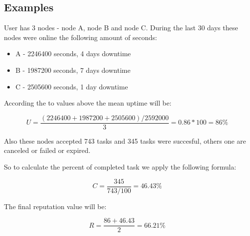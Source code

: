\subsection{Examples}

User has 3 nodes - node A, node B and node C. During the last 30 days these nodes were online the following amount of seconds:

\begin{itemize}
    \item A - 2246400 seconds, 4 days downtime
    \item B - 1987200 seconds, 7 days downtime
    \item C - 2505600 seconds, 1 day downtime
\end{itemize}

According the to values above the mean uptime will be:

\[
    U = \frac{(2246400 + 1987200 + 2505600) / 2592000}{3} = 0.86 * 100 = 86\%
\]

Also these nodes accepted 743 tasks and 345 tasks were succesful, others one are canceled or failed or expired.

So to calculate the percent of completed task we apply the following formula:

\[
    C = \frac{345}{743 / 100} = 46.43\%
\]

The final reputation value will be:

\[
    R = \frac{86 + 46.43}{2} = 66.21\%
\]
